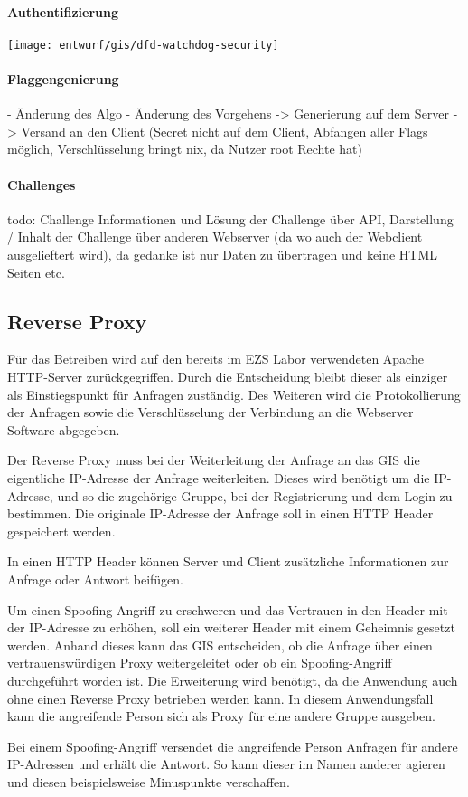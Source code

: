 \paragraph{Authentifizierung}

\texttt{[image: entwurf/gis/dfd-watchdog-security]}

\paragraph{Flaggengenierung}
- Änderung des Algo
- Änderung des Vorgehens -> Generierung auf dem Server -> Versand an den Client (Secret nicht auf dem Client, Abfangen aller Flags möglich, Verschlüsselung bringt nix, da Nutzer root Rechte hat)

\paragraph{Challenges}
todo:
Challenge Informationen und Lösung der Challenge über API, Darstellung / Inhalt der Challenge über anderen Webserver (da wo auch der Webclient ausgelieftert wird), da gedanke ist nur Daten zu übertragen und keine HTML Seiten etc.

\subsection{Reverse Proxy}
Für das Betreiben wird auf den bereits im EZS Labor verwendeten Apache HTTP-Server zurückgegriffen. Durch die Entscheidung bleibt dieser als einziger als Einstiegspunkt für Anfragen zuständig. Des Weiteren wird die Protokollierung der Anfragen sowie die Verschlüsselung der Verbindung an die Webserver Software abgegeben.

Der Reverse Proxy muss bei der Weiterleitung der Anfrage an das GIS die eigentliche IP-Adresse der Anfrage weiterleiten. Dieses wird benötigt um die IP-Adresse, und so die zugehörige Gruppe, bei der Registrierung und dem Login zu bestimmen. Die originale IP-Adresse der Anfrage soll in einen HTTP Header gespeichert werden.

In einen HTTP Header können Server und Client zusätzliche Informationen zur Anfrage oder Antwort beifügen.\cite{mdncontributorsHTTPHeaders2020}

Um einen Spoofing-Angriff zu erschweren und das Vertrauen in den Header mit der IP-Adresse zu erhöhen, soll ein weiterer Header mit einem Geheimnis gesetzt werden. Anhand dieses kann das GIS entscheiden, ob die Anfrage über einen vertrauenswürdigen Proxy weitergeleitet oder ob ein Spoofing-Angriff durchgeführt worden ist. Die Erweiterung wird benötigt, da die Anwendung auch ohne einen Reverse Proxy betrieben werden kann. In diesem Anwendungsfall kann die angreifende Person sich als Proxy für eine andere Gruppe ausgeben.

Bei einem Spoofing-Angriff versendet die angreifende Person Anfragen für andere IP-Adressen und erhält die Antwort. So kann dieser im Namen anderer agieren und diesen beispielsweise Minuspunkte verschaffen.